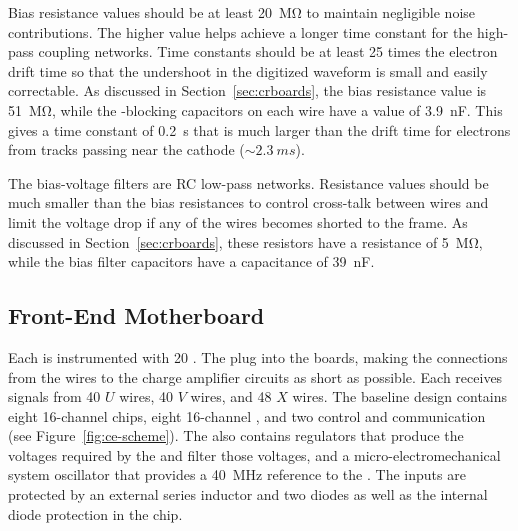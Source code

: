 Bias resistance values should be at least \SI{20}{\mega\ohm} to 
maintain negligible noise contributions. The higher value helps 
achieve a longer time constant for the high-pass coupling networks.
Time constants should be at least \num{25} times the electron 
drift time so that the undershoot in the digitized waveform
is small and easily correctable. %
As discussed in Section~\ref{sec:crboards},
the bias resistance value is \SI{51}{\mega\ohm}, while the 
-blocking capacitors on each wire have a value of
\SI{3.9}{nF}. This gives a time constant of \SI{0.2}{s} that
is much larger than the drift time for electrons from tracks
passing near the cathode ($\sim\SI{2.3}{ms}$).

The bias-voltage filters are RC low-pass networks. Resistance 
values should be much smaller than the bias resistances to control 
cross-talk between wires and limit the voltage drop if any of the 
wires becomes shorted to the  frame. As discussed
in Section~\ref{sec:crboards}, these resistors have a resistance of
\SI{5}{\mega\ohm}, while the bias filter capacitors have a
capacitance of \SI{39}{nF}.

\subsection{Front-End Motherboard}
\label{sec:fdsp-tpcelec-design-femb}

Each  is instrumented with \num{20} .
The  plug into the   boards, 
making the connections from the wires to the charge amplifier 
circuits as short as possible. Each  receives signals 
from \num{40} $U$ wires, \num{40} $V$ wires, and \num{48} $X$ wires.
The baseline  design contains eight \num{16}-channel 
 chips, eight \num{16}-channel 
 , and two  control and 
communication  (see Figure~\ref{fig:ce-scheme}).
The  also contains regulators that produce the voltages 
required by the  and filter those voltages, and 
a micro-electromechanical system oscillator that provides
a \SI{40}{MHz} reference to the  . The  
inputs are protected by an external series inductor and two 
diodes as well as the internal diode protection in the chip.

